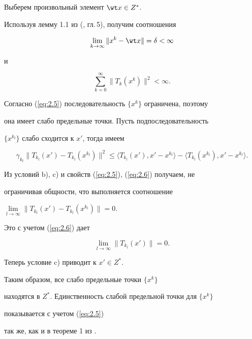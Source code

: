\begin{pf}


Выберем произвольный элемент $\wt x \in Z^*$.


Используя лемму 1.1 из (\cite{GT89}, гл.\,5), получим соотношения


\begin{equation} \label{eq:2.5} 


\lim_{k \rightarrow \infty} \| x^{k} - \wt x \|=\delta < \infty 


\end{equation}


и


\begin{equation} \label{eq:2.6} 


\sum_{k=0}^{\infty} \| T_{k} (x^{k}) \|^2 < \infty. 


\end{equation}


Согласно (\ref{eq:2.5}) последовательность $\{x^{k} \}$ ограничена, поэтому 


она имеет слабо предельные точки. Пусть подпоследовательность 


$\{x^{k_{l}} \}$ слабо сходится к $x'$, тогда имеем


$$


\gamma_{k_{l}} \| T_{k_{l}} (x') - T_{k_{l}} (x^{k_{l}} ) \|^2 \leq 


\langle T_{k_{l}} (x'), x' - x^{k_{l}} \rangle -


\langle T_{k_{l}} (x^{k_{l}} ), x' - x^{k_{l}} \rangle.


$$


Из условий b), c) и свойств (\ref{eq:2.5}), (\ref{eq:2.6}) получаем, не 


ограничивая общности, что выполняется соотношение


$\lim\limits_{l \rightarrow \infty} \| T_{k_{l}}


(x') - T_{k_{l}} (x^{k_{l}} ) \|=0$.


Это с учетом (\ref{eq:2.6}) дает


$$


\lim_{l \rightarrow \infty} \| T_{k_{l}} (x') \|=0.


$$


Теперь условие c) приводит к $x' \in Z^*$. 


Таким образом, все слабо предельные точки $\{x^{k} \}$ 


находятся в $ Z^*$. Единственность слабой предельной точки для $\{x^{k} \}$ 


показывается с учетом (\ref{eq:2.5})


так же, как и в теореме 1 из \cite{Roc76}. 


\end{pf}





